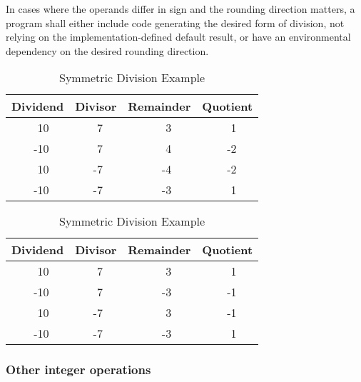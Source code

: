 In cases where the operands differ in sign and the rounding
direction matters, a program shall either include code generating
the desired form of division, not relying on the
implementation-defined default result, or have an environmental
dependency on the desired rounding direction.

\begin{table}[ht]
\begin{center}
  \begin{minipage}{0.48\textwidth}
	\begin{center}
		\caption{Floored Division Example}

		\label{table:floor}
		\begin{tabular}{lrllrllrllrl}
		\hline\hline
		\multicolumn{3}{c}{Dividend} &
		\multicolumn{3}{c}{Divisor} &
		\multicolumn{3}{c}{Remainder} &
		\multicolumn{3}{c}{Quotient} \\
		\hline
		&  10 &&&  7 &&&  3 &&&  1 \\
		& -10 &&&  7 &&&  4 &&& -2 \\
		&  10 &&& -7 &&& -4 &&& -2 \\
		& -10 &&& -7 &&& -3 &&&  1 \\
		\hline\hline
		\end{tabular}
	\end{center}
  \end{minipage}
  \begin{minipage}{0.48\textwidth}
	\begin{center}
		\caption{Symmetric Division Example}
		\label{table:round}
		\begin{tabular}{lrllrllrllrl}
		\hline\hline
		\multicolumn{3}{c}{Dividend} &
		\multicolumn{3}{c}{Divisor} &
		\multicolumn{3}{c}{Remainder} &
		\multicolumn{3}{c}{Quotient} \\
		\hline
		&  10 &&&  7 &&&  3 &&&  1 \\
		& -10 &&&  7 &&& -3 &&& -1 \\
		&  10 &&& -7 &&&  3 &&& -1 \\
		& -10 &&& -7 &&& -3 &&&  1 \\
		\hline\hline
		\end{tabular}
	\end{center}
  \end{minipage}
\end{center}
\end{table}

\subsubsection{Other integer operations} %
\label{usage:intops}

